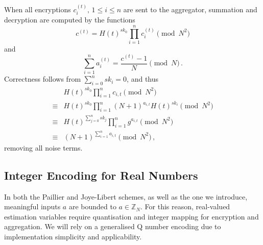 \documentclass[10pt,letterpaper,oneside,twocolumn,journal]{IEEEtran}
\theoremstyle{definition}
\theoremstyle{definition}
\theoremstyle{remark}
\begin{document}
When all encryptions $c^{(t)}_{i},\,1\leq i \leq n$ are sent to the aggregator, summation and decryption are computed by the functions
\begin{equation}
    c^{(t)} = H(t)^{sk_0}\prod^{n}_{i=1}c^{(t)}_{i} \pmod{N^2} \label{eqn:agg_summation}
\end{equation}
and
\begin{equation}
    \sum^{n}_{i=1}a^{(t)}_{i} = \frac{c^{(t)}-1}{N} \pmod{N}\,. \label{eqn:agg_decryption}
\end{equation}
Correctness follows from $\sum^{n}_{i=0}sk_i = 0$, and thus
\begin{equation*}
    \begin{split}
        &H(t)^{sk_0}\prod^{n}_{i=1}c_{i,t} \pmod{N^2} \\
        \equiv &H(t)^{sk_0}\prod^{n}_{i=1}(N+1)^{a_{i,t}} H(t)^{sk_i} \pmod{N^2} \\
        \equiv &H(t)^{\sum^n_{j=0}sk_j} \prod^{n}_{i=1}g^{a_{i,t}} \pmod{N^2} \\
        \equiv &(N+1)^{\sum^n_{i=1}a_{i,t}} \pmod{N^2}\,,
    \end{split}
\end{equation*}
removing all noise terms.

% 
% 

\subsection{Integer Encoding for Real Numbers} \label{subsec:encoding}
In both the Paillier and Joye-Libert schemes, as well as the one we introduce, meaningful inputs $a$ are bounded to $a \in \mathbb{Z}_N$. For this reason, real-valued estimation variables require quantisation and integer mapping for encryption and aggregation. We will rely on a generalised Q number encoding \cite{oberstarFixedPointRepresentationFractional2007} due to implementation simplicity and applicability.
\end{document}
